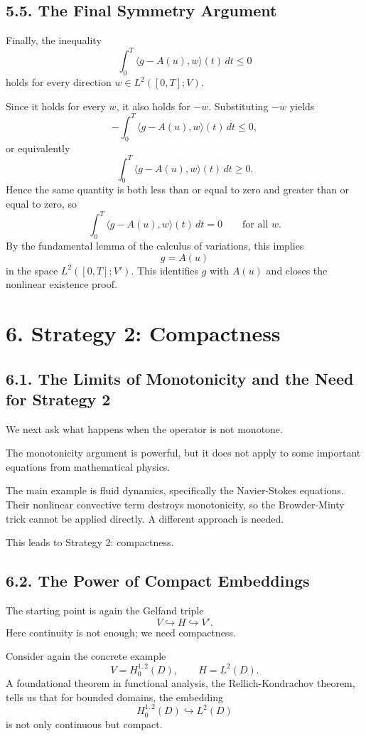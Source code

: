 \documentclass[11pt]{article}
\theoremstyle{definition}
\theoremstyle{remark}
\begin{document}
\subsection*{5.5. The Final Symmetry Argument}
Finally, the inequality
\[
\int_0^T \langle g-A(u),w\rangle(t)\,dt\le 0
\]
holds for every direction \(w\in L^2([0,T];V)\).

Since it holds for every \(w\), it also holds for \(-w\). Substituting \(-w\) yields
\[
-\int_0^T \langle g-A(u),w\rangle(t)\,dt\le 0,
\]
or equivalently
\[
\int_0^T \langle g-A(u),w\rangle(t)\,dt\ge 0.
\]
Hence the same quantity is both less than or equal to zero and greater than or equal to zero, so
\[
\int_0^T \langle g-A(u),w\rangle(t)\,dt=0
\qquad
\text{for all } w.
\]
By the fundamental lemma of the calculus of variations, this implies
\[
g=A(u)
\]
in the space \(L^2([0,T];V')\). This identifies \(g\) with \(A(u)\) and closes the nonlinear existence proof.

\section*{6. Strategy 2: Compactness}

\subsection*{6.1. The Limits of Monotonicity and the Need for Strategy 2}
We next ask what happens when the operator is not monotone.

The monotonicity argument is powerful, but it does not apply to some important equations from mathematical physics.

The main example is fluid dynamics, specifically the Navier-Stokes equations. Their nonlinear convective term destroys monotonicity, so the Browder-Minty trick cannot be applied directly. A different approach is needed.

This leads to Strategy 2: compactness.

\subsection*{6.2. The Power of Compact Embeddings}
The starting point is again the Gelfand triple
\[
V\hookrightarrow H\hookrightarrow V'.
\]
Here continuity is not enough; we need compactness.

Consider again the concrete example
\[
V=H_0^{1,2}(D),
\qquad
H=L^2(D).
\]
A foundational theorem in functional analysis, the Rellich-Kondrachov theorem, tells us that for bounded domains, the embedding
\[
H_0^{1,2}(D)\hookrightarrow L^2(D)
\]
is not only continuous but compact.
\end{document}
